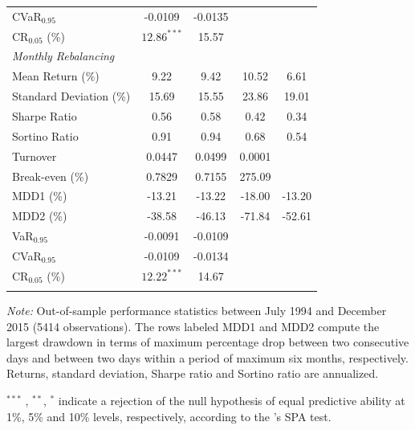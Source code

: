 \documentclass[a4paper,10pt]{article}
\begin{document}
\begin{threeparttable}[H]
\begin{tabularx}{\textwidth}{@{\extracolsep{\fill}}lcccc@{}}
		CVaR$_{0.95}$ & -0.0109 & -0.0135 &  & \\
		CR$_{0.05}$ (\%) & $12.86^{***}$ & 15.57 &  &  \\
		\midrule[\heavyrulewidth] \textit{Monthly Rebalancing} &  &  &  &  \\
		\midrule[\heavyrulewidth] Mean Return (\%) & 9.22 & 9.42 & 10.52 & 6.61
		\\
		Standard Deviation (\%) & 15.69 & 15.55 & 23.86 & 19.01 \\
		Sharpe Ratio & 0.56 & 0.58 & 0.42 & 0.34 \\
		Sortino Ratio & 0.91 & 0.94 & 0.68 & 0.54 \\
		Turnover & 0.0447 & 0.0499 & 0.0001 &  \\
		Break-even (\%) &  0.7829 & 0.7155 & 275.09 &  \\
		MDD1 (\%) & -13.21 & -13.22 & -18.00 & -13.20 \\
		MDD2 (\%) & -38.58 & -46.13 & -71.84 & -52.61 \\
		VaR$_{0.95}$ &  -0.0091 & -0.0109 &  &  \\
		CVaR$_{0.95}$ & -0.0109 & -0.0134 &  &  \\
		CR$_{0.05}$ (\%) & $12.22^{***}$ & 14.67 &  &  \\
		\bottomrule &  &  &  &
	\end{tabularx}%
\begin{tablenotes}
\item \textit{Note:} \scriptsize Out-of-sample performance statistics between July 1994 and December 2015 (5414 observations). The rows labeled MDD1 and MDD2 compute the largest drawdown in terms of maximum percentage drop between two consecutive days and between two days within a period of maximum six months, respectively. Returns, standard deviation, Sharpe ratio and Sortino ratio are annualized.
\item \scriptsize $^{\ast\ast\ast}$ , $^{\ast\ast}$, $^{\ast}$ indicate a rejection of the null hypothesis of equal predictive ability at 1\%, 5\% and 10\% levels, respectively, according to the \citet*{hansen2005test}'s SPA test.

\end{tablenotes}
\label{tab:table01}%
\end{threeparttable}

\vspace{0.3cm}
\end{document}
